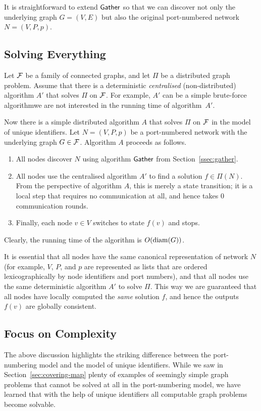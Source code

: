 It is straightforward to extend $\textsf{Gather}$ so that we can discover not only the underlying graph $G = (V,E)$ but also the original port-numbered network $N = (V,P,p)$.


\subsection{Solving Everything}

Let $\mathcal{F}$ be a family of connected graphs, and let $\Pi$ be a distributed graph problem. Assume that there is a deterministic \emph{centralised} (non-distributed) algorithm $A'$ that solves $\Pi$ on $\mathcal{F}$. For example, $A'$ can be a simple brute-force algorithm\mydash we are not interested in the running time of algorithm~$A'$.

Now there is a simple distributed algorithm $A$ that solves $\Pi$ on $\mathcal{F}$ in the model of unique identifiers. Let $N = (V,P,p)$ be a port-numbered network with the underlying graph $G \in \mathcal{F}$. Algorithm $A$ proceeds as follows.
\begin{enumerate}
    \item All nodes discover $N$ using algorithm $\textsf{Gather}$ from Section~\ref{ssec:gather}.
    \item All nodes use the centralised algorithm $A'$ to find a solution $f \in \Pi(N)$. From the perspective of algorithm $A$, this is merely a state transition; it is a local step that requires no communication at all, and hence takes $0$ communication rounds.
    \item Finally, each node $v \in V$ switches to state $f(v)$ and stops.
\end{enumerate}
Clearly, the running time of the algorithm is $O(\operatorname{diam}(G))$.

It is essential that all nodes have the same canonical representation of network $N$ (for example, $V$, $P$, and $p$ are represented as lists that are ordered lexicographically by node identifiers and port numbers), and that all nodes use the same deterministic algorithm $A'$ to solve $\Pi$. This way we are guaranteed that all nodes have locally computed the \emph{same} solution $f$, and hence the outputs $f(v)$ are globally consistent.


\subsection{Focus on Complexity}

The above discussion highlights the striking difference between the port-numbering model and the model of unique identifiers. While we saw in Section~\ref{sec:covering-map} plenty of examples of seemingly simple graph problems that cannot be solved at all in the port-numbering model, we have learned that with the help of unique identifiers all computable graph problems become solvable.

